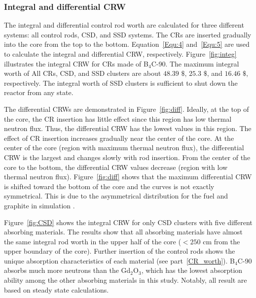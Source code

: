 \subsubsection{Integral and differential CRW}

The integral and differential control rod worth are calculated for three 
different systems: all control rods, CSD, and SSD systems. The CRs are 
inserted gradually into the core from the top to the bottom. 
Equation~\ref{Equ:4} and~\ref{Equ:5} are used to calculate the integral and 
differential CRW, respectively. Figure~\ref{fig:integ} illustrates the integral CRW for CRs 
made of B$_4$C-90. The maximum integral worth of All CRs, CSD, and SSD 
clusters are about $48.39$ $\$$, $25.3$ $\$$, and $16.46$ $\$$, respectively. The 
integral worth of SSD clusters is sufficient to shut down the reactor from any 
state.

The differential CRWs are demonstrated in Figure~\ref{fig:diff}. Ideally, at the top of the core, the CR insertion has little effect since this region has low thermal neutron flux. Thus, the differential CRW has the lowest values in this region. The effect of CR insertion increases gradually near the center of the core. At the center of the core (region with maximum thermal neutron flux), the differential CRW is the largest and changes slowly with rod insertion. From the center of the core to the bottom, the differential CRW values decrease (region with low thermal neutron flux). Figure~\ref{fig:diff} shows that the maximum differential CRW is shifted toward the bottom of the core and the curves is not exactly symmetrical. This is due to the asymmetrical distribution for the fuel and graphite in simulation \cite{xuemei2013study,son2016control}.

Figure~\ref{fig:CSD} shows the integral CRW for only CSD clusters with five 
different absorbing materials. The results show that all absorbing materials 
have almost the same integral rod worth in the upper half of the core 
($<250$ cm from the upper boundary of the core). Further insertion of the 
control rods shows the unique absorption characteristics of each material (see 
part~\ref{CR_worth}). B$_4$C-90 absorbs much more neutrons than the 
Gd$_2$O$_3$, which has the lowest absorption ability among the other absorbing 
materials in this study. Notably, all result are based on steady state calculations. 

